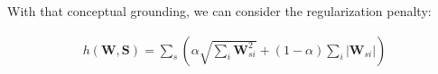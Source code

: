 

With that conceptual grounding, we can consider the {\soslasso} regularization penalty:

\begin{align}
h(\mathbf{W},\mathbf{S}) = \sum_{s}\left(  \alpha \sqrt{\sum_{i} \mathbf{W}_{si}^2} + (1-\alpha) \sum_{i} |\mathbf{W}_{si}| \right) 
\end{align}

